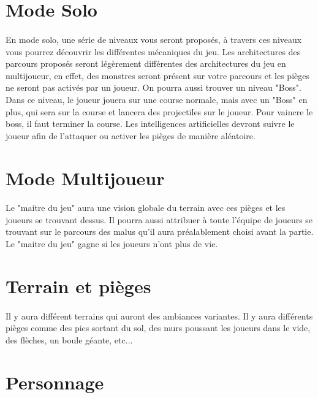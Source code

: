 \documentclass[12pt]{report}
\begin{document}
	\section{Mode Solo}
	\paragraph{}
		En mode solo, une série de niveaux vous seront proposés, à travers ces niveaux vous pourrez découvrir les différentes mécaniques du jeu. Les architectures des parcours proposés seront légèrement différentes des architectures du jeu en multijoueur, en effet, des monstres seront présent sur votre parcours et les pièges ne seront pas activés par un joueur. On pourra aussi trouver un niveau "Boss". Dans ce niveau, le joueur jouera sur une course normale, mais avec un "Boss" en plus, qui sera sur la course et lancera des projectiles sur le joueur. Pour vaincre le boss, il faut terminer la course. Les intelligences artificielles devront suivre le joueur afin de l'attaquer ou activer les pièges de manière aléatoire.

	\section{Mode Multijoueur}
	\paragraph{}
		Le "maitre du jeu" aura une vision globale du terrain avec ces pièges et les joueurs se trouvant dessus. Il pourra aussi attribuer à toute l'équipe de joueurs se trouvant sur le parcours des malus qu'il aura préalablement choisi avant la partie. Le "maitre du jeu" gagne si les joueurs n'ont plus de vie.
		
	\section{Terrain et pièges}
	\paragraph{}
		Il y aura différent terrains qui auront des ambiances variantes. 
		Il y aura différents pièges comme des pics sortant du sol, des murs poussant les joueurs dans le vide, des flèches, un boule géante, etc...

	\section{Personnage}
\end{document}
